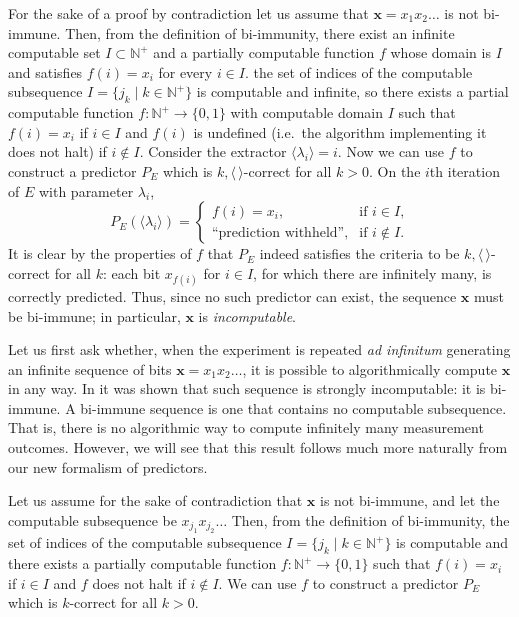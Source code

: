 \documentclass[%
 superscriptaddress,
 preprint,
 showpacs,
 showkeys,
 preprintnumbers,
  amsmath,amssymb,
  aps,
 pra,
  longbibliography,
  floatfix,
 ]{revtex4-1}
\theoremstyle{definition}
\newcommand{\N}{\mathbb{N}}%
\newcommand{\x}{\mathbf{x}}
\begin{document}
{\color{green}For the sake of a proof by contradiction let us assume} that $\x=x_1x_2\dots$ is not bi-immune.  %
Then, from the definition of bi-immunity, there exist an infinite computable set $I \subset \N^+$ and a partially computable function $f$ whose domain is
$I$ and satisfies $f(i)=x_i$ for every $i\in I$.
the set of indices of the computable subsequence $I=\{j_k \mid k\in\N^+\}$ is computable and infinite, so there exists a partial computable function $f:\N^+ \to \{0,1\}$ with computable domain $I$ such that $f(i)=x_i$ if $i\in I$ and $f(i)$ is undefined (i.e.\ the algorithm implementing it does not halt) if $i\notin I$.
\fi
Consider the extractor $\langle \lambda_i\rangle = i$.
 Now we can use $f$ to construct a predictor $P_E$ which is $k,\langle \, \rangle$-correct for all $k>0$. On the $i$th iteration of $E$ with parameter $\lambda_i$, $$P_E(\langle\lambda_i\rangle)=\begin{cases}f(i)=x_i, & \text{if $i\in I$,}\\\text{``{prediction withheld}'',} & \text{if $i\notin I$.}\end{cases}$$
It is clear by the properties of $f$ that $P_E$ indeed satisfies the criteria to be $k,\langle \, \rangle$-correct for all $k$:
each bit $x_{f(i)}$ for $i\in I$, for which there are infinitely many, is correctly predicted.
Thus, since no such predictor can exist, the sequence $\x$ must be bi-immune; in particular,   $\x$ is {\em incomputable}.

Let us first ask whether, when the experiment is repeated \emph{ad infinitum} generating an infinite sequence of bits $\x=x_1x_2\dots$, it is possible to algorithmically compute $\x$ in any way.
In \cite{svozil-2006-ran,2012-incomput-proofsCJ} it was shown that such sequence is strongly incomputable: it is bi-immune.
A bi-immune sequence is one that contains no computable subsequence.
That is, there is no algorithmic way to compute infinitely many measurement outcomes.
However, we will see that this result follows much more naturally from our new formalism of predictors.

Let us assume for the sake of contradiction that $\x$ is not bi-immune, and let the computable subsequence be $x_{j_1}x_{j_2}\dots$
Then, from the definition of bi-immunity, the set of indices of the computable subsequence $I=\{j_k \mid k\in\N^+\}$ is computable and there exists a partially computable function $f:\N^+ \to \{0,1\}$ such that $f(i)=x_i$ if $i\in I$ and $f$ does not halt if $i\notin I$.
We can use $f$ to construct a predictor $P_E$ which is $k$-correct for all $k>0$.
\end{document}

